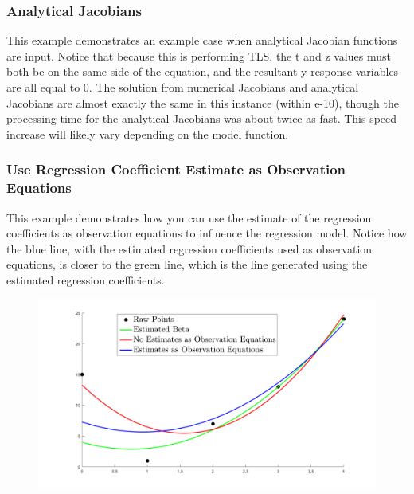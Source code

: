 \documentclass{article}
\begin{document}
	\subsubsection*{Analytical Jacobians}
	This example demonstrates an example case when analytical Jacobian functions are input. Notice that because this is performing TLS, the t and z values must both be on the same side of the equation, and the resultant y response variables are all equal to 0.  The solution from numerical Jacobians and analytical Jacobians are almost exactly the same in this instance (within e-10), though the processing time for the analytical Jacobians was about twice as fast.  This speed increase will likely vary depending on the model function.    
	
	
	\clearpage
	\subsubsection{Use Regression Coefficient Estimate as Observation Equations}
	This example demonstrates how you can use the estimate of the regression coefficients as observation equations to influence the regression model.  Notice how the blue line, with the estimated regression coefficients used as observation equations, is closer to the green line, which is the line generated using the estimated regression coefficients.
	
	
	\begin{figure}[H]
		\centering
		\includegraphics[width = \linewidth]{betacov}
	\end{figure}
	
\end{document}
